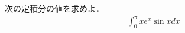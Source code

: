 \documentclass[../../main.tex]{subfiles}
\begin{document}
次の定積分の値を求めよ．
\begin{align}
  \int_0^\pi xe^x\sin xdx
\end{align}
\end{document}
